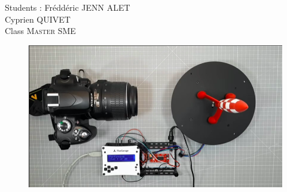 \begin{titlepage}
  \Large
  Students : Fréddéric \textsc{JENN ALET}\\ %
  \Large
   Cyprien  \textsc{QUIVET}\\ %
   \Large
   Class  \textsc{ Master SME}\\ %
  

  
  \begin{figure}[b]
    \centering
    \includegraphics[scale=0.4]{img/presentation.png}\\%
    \label{fig:LogoTachyssema}
  \end{figure}

  
   
  
  \end{titlepage}